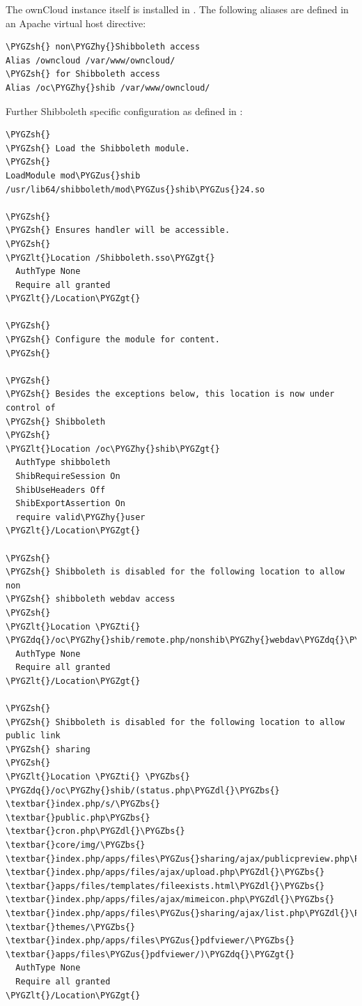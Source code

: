 \documentclass[letterpaper,10pt,english]{sphinxmanual}
\def\PYGZbs{\char`\\}
\def\PYGZus{\char`\_}
\def\PYGZlt{\char`\<}
\def\PYGZgt{\char`\>}
\def\PYGZsh{\char`\#}
\def\PYGZdl{\char`\$}
\def\PYGZhy{\char`\-}
\def\PYGZdq{\char`\"}
\def\PYGZti{\char`\~}
\begin{document}
The ownCloud instance itself is installed in .  The
following aliases are defined in an Apache virtual host directive:

\begin{Verbatim}[commandchars=\\\{\}]
\PYGZsh{} non\PYGZhy{}Shibboleth access
Alias /owncloud /var/www/owncloud/
\PYGZsh{} for Shibboleth access
Alias /oc\PYGZhy{}shib /var/www/owncloud/
\end{Verbatim}

Further Shibboleth specific configuration as defined in
:

\begin{Verbatim}[commandchars=\\\{\}]
\PYGZsh{}
\PYGZsh{} Load the Shibboleth module.
\PYGZsh{}
LoadModule mod\PYGZus{}shib /usr/lib64/shibboleth/mod\PYGZus{}shib\PYGZus{}24.so

\PYGZsh{}
\PYGZsh{} Ensures handler will be accessible.
\PYGZsh{}
\PYGZlt{}Location /Shibboleth.sso\PYGZgt{}
  AuthType None
  Require all granted
\PYGZlt{}/Location\PYGZgt{}

\PYGZsh{}
\PYGZsh{} Configure the module for content.
\PYGZsh{}

\PYGZsh{}
\PYGZsh{} Besides the exceptions below, this location is now under control of
\PYGZsh{} Shibboleth
\PYGZsh{}
\PYGZlt{}Location /oc\PYGZhy{}shib\PYGZgt{}
  AuthType shibboleth
  ShibRequireSession On
  ShibUseHeaders Off
  ShibExportAssertion On
  require valid\PYGZhy{}user
\PYGZlt{}/Location\PYGZgt{}

\PYGZsh{}
\PYGZsh{} Shibboleth is disabled for the following location to allow non
\PYGZsh{} shibboleth webdav access
\PYGZsh{}
\PYGZlt{}Location \PYGZti{} \PYGZdq{}/oc\PYGZhy{}shib/remote.php/nonshib\PYGZhy{}webdav\PYGZdq{}\PYGZgt{}
  AuthType None
  Require all granted
\PYGZlt{}/Location\PYGZgt{}

\PYGZsh{}
\PYGZsh{} Shibboleth is disabled for the following location to allow public link
\PYGZsh{} sharing
\PYGZsh{}
\PYGZlt{}Location \PYGZti{} \PYGZbs{}
\PYGZdq{}/oc\PYGZhy{}shib/(status.php\PYGZdl{}\PYGZbs{}
\textbar{}index.php/s/\PYGZbs{}
\textbar{}public.php\PYGZbs{}
\textbar{}cron.php\PYGZdl{}\PYGZbs{}
\textbar{}core/img/\PYGZbs{}
\textbar{}index.php/apps/files\PYGZus{}sharing/ajax/publicpreview.php\PYGZdl{}\PYGZbs{}
\textbar{}index.php/apps/files/ajax/upload.php\PYGZdl{}\PYGZbs{}
\textbar{}apps/files/templates/fileexists.html\PYGZdl{}\PYGZbs{}
\textbar{}index.php/apps/files/ajax/mimeicon.php\PYGZdl{}\PYGZbs{}
\textbar{}index.php/apps/files\PYGZus{}sharing/ajax/list.php\PYGZdl{}\PYGZbs{}
\textbar{}themes/\PYGZbs{}
\textbar{}index.php/apps/files\PYGZus{}pdfviewer/\PYGZbs{}
\textbar{}apps/files\PYGZus{}pdfviewer/)\PYGZdq{}\PYGZgt{}
  AuthType None
  Require all granted
\PYGZlt{}/Location\PYGZgt{}


\end{Verbatim}
\end{document}
